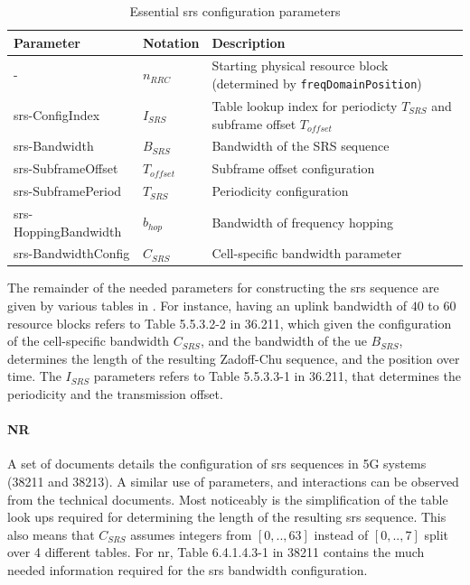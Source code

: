 \begin{table}[]
\begin{tabular}{@{}llp{8cm}@{}}
\toprule
Parameter            & Notation  & Description                                                           \\ \midrule
-                    & $n_{RRC}$    & Starting physical resource block (determined by \texttt{freqDomainPosition})   \\
srs-ConfigIndex      & $I_{SRS}$    & Table lookup index for periodicty $T_{SRS}$ and subframe offset $T_{offset}$   \\
srs-Bandwidth        & $B_{SRS}$    & Bandwidth of the SRS sequence                                        \\
srs-SubframeOffset   & $T_{offset}$ & Subframe offset configuration                                         \\
srs-SubframePeriod   & $T_{SRS}$    & Periodicity configuration                                             \\
srs-HoppingBandwidth & $b_{hop}$    & Bandwidth of frequency hopping                                        \\
srs-BandwidthConfig  & $C_{SRS}$    & Cell-specific bandwidth parameter                                     \\ \bottomrule
\end{tabular}
\vspace{1em}
\caption{Essential \gls{srs} configuration parameters}\label{tab:srs_config_param}
\end{table}

The remainder of the needed parameters for constructing the \gls{srs} sequence are given by various tables in \cite{36211,3GPP2020TS15}. For instance, having an uplink bandwidth of $40$ to $60$ resource blocks refers to Table 5.5.3.2-2 in 36.211, which given the configuration of the cell-specific bandwidth $C_{SRS}$, and the bandwidth of the \gls{ue} $B_{SRS}$, determines the length of the resulting Zadoff-Chu sequence, and the position over time. The $I_{SRS}$ parameters refers to Table 5.5.3.3-1 in 36.211, that determines the periodicity and the transmission offset.


\paragraph{NR}
A set of documents details the configuration of \gls{srs} sequences in 5G systems \cite{38211, 3GPP2020TS15b} (38211 and 38213). A similar use of parameters, and interactions can be observed from the technical documents. Most noticeably is the simplification of the table look ups required for determining the length of the resulting \gls{srs} sequence. This also means that $C_{SRS}$ assumes integers from $[0,.., 63]$ instead of $[0,..,7]$ split over 4 different tables. For \gls{nr}, Table 6.4.1.4.3-1 in 38211 contains the much needed information required for the \gls{srs} bandwidth configuration.
